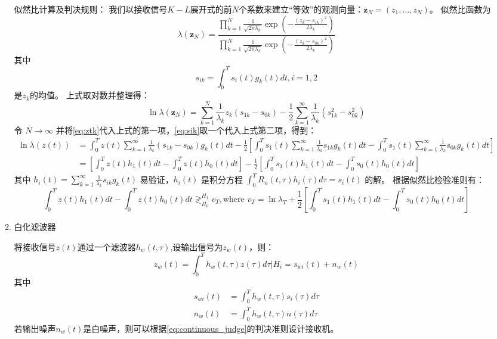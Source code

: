 \documentclass{article}
\begin{document}
\begin{enumerate}
\begin{enumerate}[label=(\alph*)]
似然比计算及判决规则：
我们以接收信号$K-L$展开式的前$N$个系数来建立“等效”的观测向量：$\bm{z}_N = (z_1,\dots,z_N)$。
似然比函数为
$$
\lambda(\bm{z}_N) = \frac{\prod_{k=1}^N \frac{1}{\sqrt{2\pi \lambda_k}} \exp\left(-\frac{(z_k-s_{1k})^2}{2\lambda_k}\right)}{\prod_{k=1}^N \frac{1}{\sqrt{2\pi \lambda_k}} \exp\left(-\frac{(z_k-s_{0k})^2}{2\lambda_k}\right)}
$$
其中 
\begin{equation}\label{eq:sik}
s_{ik}= \int_0^T s_i(t)g_k(t)dt,i=1,2
\end{equation}
是$z_k$的均值。
上式取对数并整理得：
$$
\ln \lambda(\bm{z}_N) = \sum_{k=1}^N \frac{1}{\lambda_k} z_k(s_{1k}-s_{0k}) - \frac{1}{2} \sum_{k=1}^{\infty} \frac{1}{\lambda_k} (s_{1k}^2 -s_{0k}^2)
$$
令 $N\to\infty$ 并将\eqref{eq:ztk}代入上式的第一项，\eqref{eq:sik}取一个代入上式第二项，得到：
\footnotesize
\begin{align*}
\ln \lambda(z(t)) & = \int_0^T z(t)\sum_{k=1}^{\infty} \frac{1}{\lambda_k} (s_{1k}-s_{0k})g_k(t)dt - \frac{1}{2}\left[\int_0^T s_1(t)\sum_{k=1}^{\infty} \frac{1}{\lambda_k} s_{1k}g_k(t)dt - \int_0^T s_1(t)\sum_{k=1}^{\infty} \frac{1}{\lambda_k} s_{0k}g_k(t)dt \right] \\
 & = \left[\int_0^T z(t) h_1(t)dt - \int_0^T z(t) h_0(t)dt\right] - \frac{1}{2}\left[\int_0^T s_1(t) h_1(t)dt - \int_0^T s_0(t) h_0(t)dt\right]
\end{align*}
\normalsize
其中 $h_i(t) = \sum_{k=1}^\infty \frac{1}{\lambda_k} s_{ik}g_k(t)$
易验证，$h_i(t)$ 是积分方程 $\int_0^T R_n(t,\tau)h_i(\tau)d\tau = s_i(t)$ 的解。
根据似然比检验准则有：
\small
\begin{equation}
\int_0^T z(t) h_1(t)dt - \int_0^T z(t) h_0(t)dt \mathop{\gtrless}_{H_0}^{H_1} v_T,\text{where } v_T=\ln \lambda_T + \frac{1}{2}\left[\int_0^T s_1(t) h_1(t)dt - \int_0^T s_0(t) h_0(t)dt\right]
\end{equation}
\normalsize
\item 白化滤波器

将接收信号$z(t)$通过一个滤波器$h_w(t,\tau)$,设输出信号为$z_w(t)$，则：
\begin{equation}
z_w(t) = \int_0^T h_w(t,\tau)z(\tau)d\tau | H_i = s_{wi}(t) + n_w(t)
\end{equation}
其中
\begin{align*}
s_{wi}(t) & = \int_0^T h_w(t,\tau)s_i(\tau)d\tau \\
n_w(t) & = \int_0^T h_w(t,\tau)n(\tau)d\tau
\end{align*}
若输出噪声$n_w(t)$是白噪声，则可以根据\eqref{eq:continuous_judge}的判决准则设计接收机。


\end{enumerate}
\end{enumerate}
\end{document}
